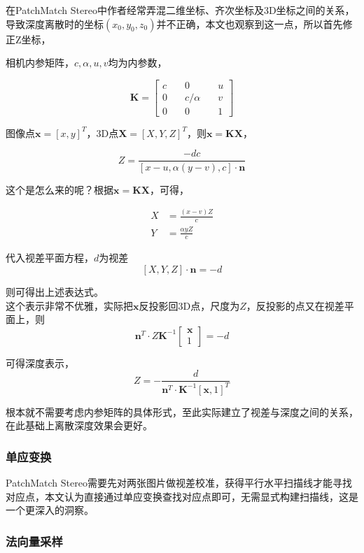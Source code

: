 在PatchMatch Stereo中作者经常弄混二维坐标、齐次坐标及3D坐标之间的关系，导致深度离散时的坐标$(x_0,y_0,z_0)$并不正确，本文也观察到这一点，所以首先修正Z坐标，

相机内参矩阵，$c,\alpha,u,v$均为内参数，

$$
	\mathbf{K} = \begin{bmatrix}
		c\quad& 0\quad& u\\
		0\quad& c/\alpha\quad& v\\
		0\quad& 0\quad& 1
	\end{bmatrix}
$$

图像点$\mathbf{x}=[x,y]^T$，3D点$\mathbf{X}=[X,Y,Z]^T$，则$\mathbf{x} = \mathbf{K}\mathbf{X}$，

$$
	Z = \frac{-dc}{[x-u,\alpha(y-v),c]\cdot\mathbf{n}}
$$

这个是怎么来的呢？根据$\mathbf{x} = \mathbf{K}\mathbf{X}$，可得，

\begin{align*}
	X &= \frac{(x-v)Z}{c}\\
	Y &= \frac{\alpha yZ}{c}
\end{align*}

代入视差平面方程，$d$为视差
$$
	[X,Y,Z]\cdot \mathbf{n} = -d
$$

则可得出上述表达式。\\

这个表示非常不优雅，实际把$\mathbf{x}$反投影回3D点，尺度为$Z$，反投影的点又在视差平面上，则
$$
	\mathbf{n}^T\cdot Z \mathbf{K}^{-1}\begin{bmatrix*}
		\mathbf{x}\\
		1
	\end{bmatrix*}=-d
$$

可得深度表示，
$$
	Z = -\frac{d}{\mathbf{n}^T\cdot \mathbf{K}^{-1}[\mathbf{x},1]^T}
$$

根本就不需要考虑内参矩阵的具体形式，至此实际建立了视差与深度之间的关系，在此基础上离散深度效果会更好。

\subsubsection*{单应变换}

PatchMatch Stereo需要先对两张图片做视差校准，获得平行水平扫描线才能寻找对应点，本文认为直接通过单应变换查找对应点即可，无需显式构建扫描线，这是一个更深入的洞察。

\subsubsection*{法向量采样}

